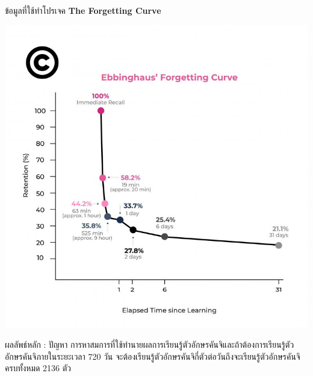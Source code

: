 \documentclass{beamer}
\begin{document}
\begin{frame}{ข้อมูลที่ใช้ทำโปรเจค}
\textbf{The Forgetting Curve }
\begin{center}
\includegraphics[scale = 0.4]{2.jpg}
\end{center}
\end{frame}

\begin{frame}{ผลลัพธ์หลัก : ปัญหา }
การหาสมการที่ใช้ทำนายผลการเรียนรู้ตัวอักษรคันจิและถ้าต้องการเรียนรู้ตัวอักษรคันจิภายในระยะเวลา 720 วัน จะต้องเรียนรู้ตัวอักษรคันจิกี่ตัวต่อวันถึงจะเรียนรู้ตัวอักษรคันจิครบทั้งหมด 2136 ตัว
\end{frame}
\end{document}
